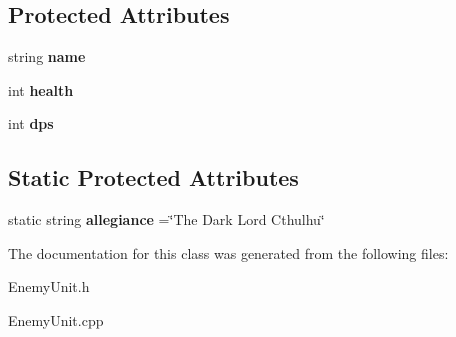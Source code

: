 \subsection*{Protected Attributes}
\begin{DoxyCompactItemize}
\item 
\hypertarget{class_enemy_unit_a30dd4f42740fb170e78bda8720740eda}{}string {\bfseries name}\label{class_enemy_unit_a30dd4f42740fb170e78bda8720740eda}

\item 
\hypertarget{class_enemy_unit_a94adccb46717e178ef57b0c88b5198c1}{}int {\bfseries health}\label{class_enemy_unit_a94adccb46717e178ef57b0c88b5198c1}

\item 
\hypertarget{class_enemy_unit_ac31f29870ecf7f5feaf23aa650d0c6a4}{}int {\bfseries dps}\label{class_enemy_unit_ac31f29870ecf7f5feaf23aa650d0c6a4}

\end{DoxyCompactItemize}
\subsection*{Static Protected Attributes}
\begin{DoxyCompactItemize}
\item 
\hypertarget{class_enemy_unit_a69dc9271045ac595cf03f9d5584a3961}{}static string {\bfseries allegiance} =\char`\"{}The Dark Lord Cthulhu\char`\"{}\label{class_enemy_unit_a69dc9271045ac595cf03f9d5584a3961}

\end{DoxyCompactItemize}


The documentation for this class was generated from the following files\+:\begin{DoxyCompactItemize}
\item 
Enemy\+Unit.\+h\item 
Enemy\+Unit.\+cpp\end{DoxyCompactItemize}
